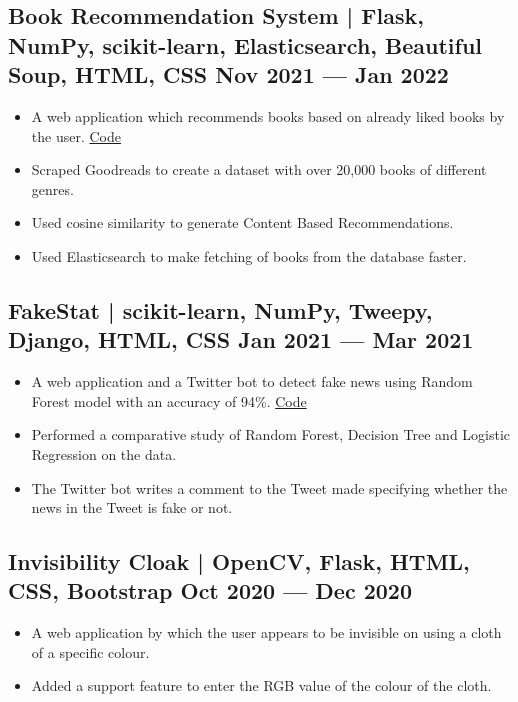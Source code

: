 \documentclass[10pt]{article}
\newenvironment{zitemize}{
\begin{itemize}\itemsep2pt \parskip0pt \parsep1pt}
{\end{itemize}\vspace{-0.7cm}}
\begin{document}
\subsection*{Book Recommendation System | \normalfont{} \normalsize Flask, NumPy, scikit-learn, Elasticsearch, Beautiful Soup, HTML, CSS  \hfill \textbf {Nov 2021 --- Jan 2022}
}
    \begin{zitemize}
    \item A web application which recommends books based on already liked books by the user. \hfill \href{https://github.com/mihikagaonkar/book-recommender-system}{Code}
     \item Scraped  Goodreads to create a dataset with over 20,000 books of different genres.
        \item Used cosine similarity to generate Content Based Recommendations.
        \item Used Elasticsearch to make fetching of books from the database faster. 
    \end{zitemize}
        \vspace{0.1cm}
\subsection*{FakeStat | \normalfont{} \normalsize scikit-learn, NumPy, Tweepy, Django, HTML, CSS \hfill \textbf{Jan 2021 --- Mar 2021}}
    \begin{zitemize}
        \item A web application and a Twitter bot to detect fake news using Random Forest model with an accuracy of 94\%. \hfill \href{https://github.com/mihikagaonkar/FakeStat}{Code}
        \item Performed a comparative study of Random Forest, Decision Tree and Logistic Regression on the data.
        \item The Twitter bot writes a comment to the Tweet made specifying whether the news in the Tweet is fake or not.
    
    \end{zitemize}
        \vspace{0.1cm}
\subsection*{Invisibility Cloak | \normalfont{} \normalsize OpenCV, Flask, HTML, CSS, Bootstrap \hfill \textbf{Oct 2020 --- Dec 2020}}
    \begin{zitemize}
        \item A web application by which the user appears to be invisible on using a cloth of a specific colour.
        \item Added a support feature to enter the RGB value of the colour of the cloth.
    \end{zitemize}
\end{document}
